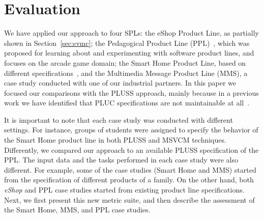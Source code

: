 \section{Evaluation}
\label{sec:evaluation}

We have applied our approach to four SPLs: the eShop Product Line, as partially
shown  in Section~\ref{sec:svmc}; the Pedagogical Product Line
(PPL)~\cite{PPL:2008}, which was proposed for learning about and experimenting
with software product lines, and focuses on the arcade game domain; the Smart
Home Product Line, based on different
specifications~\cite{Pohl:2005aa,Alferez:2008aa}, and the Multimedia Message
Product Line (MMS), a case study conducted with one of our industrial partners.  In this paper we focused our comparisons with
the PLUSS approach, mainly because in a previous work we have identified that PLUC specifications are not maintainable at all~\cite{Bonifacio:2008aa}. 


It is important to note that each case study was conducted with different
settings. For instance, groups of students were assigned to specify the behavior
of the Smart Home product line in both PLUSS and MSVCM techniques. Differently, we
compared our approach to an available PLUSS specification of the PPL. The input
data and the tasks performed in each case study were also different. For example,
some of the case studies (Smart Home and MMS) started from the specification of
different products of a family. On the other hand, both \emph{eShop} and PPL case
studies started from existing product line specifications. Next, we first present this new metric suite,
and then describe the assessment of the Smart Home, MMS, and PPL case studies. 


